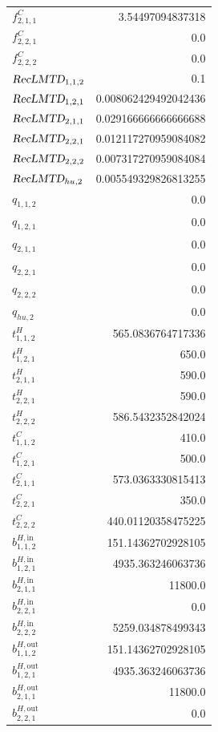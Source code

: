 \documentclass{article}%
\begin{document}
\begin{multicols*}{3}
\begin{supertabular}{lr}
	$f_{2,1,1}^{C}$ & 3.54497094837318 \\%
	$f_{2,2,1}^{C}$ & 0.0 \\%
	$f_{2,2,2}^{C}$ & 0.0 \\%
	$\textsl{RecLMTD}_{1,1,2}$ & 0.1 \\%
	$\textsl{RecLMTD}_{1,2,1}$ & 0.008062429492042436 \\%
	$\textsl{RecLMTD}_{2,1,1}$ & 0.029166666666666688 \\%
	$\textsl{RecLMTD}_{2,2,1}$ & 0.012117270959084082 \\%
	$\textsl{RecLMTD}_{2,2,2}$ & 0.007317270959084084 \\%
	$\textsl{RecLMTD}_{hu,2}$ & 0.005549329826813255 \\%
	$q_{1,1,2}$ & 0.0 \\%
	$q_{1,2,1}$ & 0.0 \\%
	$q_{2,1,1}$ & 0.0 \\%
	$q_{2,2,1}$ & 0.0 \\%
	$q_{2,2,2}$ & 0.0 \\%
	$q_{hu,2}$ & 0.0 \\%
	$t_{1,1,2}^{H}$ & 565.0836764717336 \\%
	$t_{1,2,1}^{H}$ & 650.0 \\%
	$t_{2,1,1}^{H}$ & 590.0 \\%
	$t_{2,2,1}^{H}$ & 590.0 \\%
	$t_{2,2,2}^{H}$ & 586.5432352842024 \\%
	$t_{1,1,2}^{C}$ & 410.0 \\%
	$t_{1,2,1}^{C}$ & 500.0 \\%
	$t_{2,1,1}^{C}$ & 573.0363330815413 \\%
	$t_{2,2,1}^{C}$ & 350.0 \\%
	$t_{2,2,2}^{C}$ & 440.01120358475225 \\%
	$b_{1,1,2}^{H,\text{in}}$ & 151.14362702928105 \\%
	$b_{1,2,1}^{H,\text{in}}$ & 4935.363246063736 \\%
	$b_{2,1,1}^{H,\text{in}}$ & 11800.0 \\%
	$b_{2,2,1}^{H,\text{in}}$ & 0.0 \\%
	$b_{2,2,2}^{H,\text{in}}$ & 5259.034878499343 \\%
	$b_{1,1,2}^{H,\text{out}}$ & 151.14362702928105 \\%
	$b_{1,2,1}^{H,\text{out}}$ & 4935.363246063736 \\%
	$b_{2,1,1}^{H,\text{out}}$ & 11800.0 \\%
	$b_{2,2,1}^{H,\text{out}}$ & 0.0 \\%

\end{supertabular}
\end{multicols*}
\end{document}
